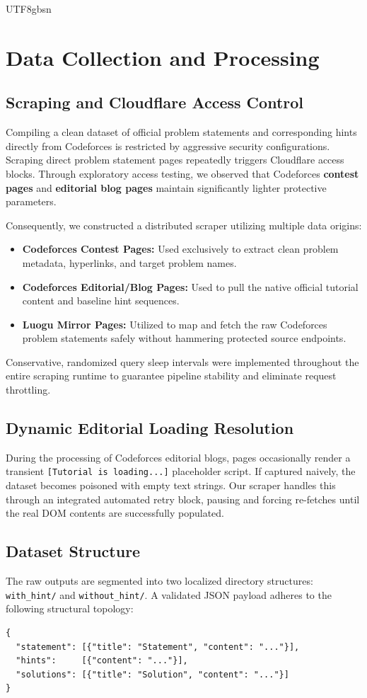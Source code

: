 \documentclass{article}
\begin{document}
\begin{CJK*}{UTF8}{gbsn}
\section{Data Collection and Processing}

\subsection{Scraping and Cloudflare Access Control}
Compiling a clean dataset of official problem statements and corresponding hints directly from Codeforces is restricted by aggressive security configurations. Scraping direct problem statement pages repeatedly triggers Cloudflare access blocks. Through exploratory access testing, we observed that Codeforces \textbf{contest pages} and \textbf{editorial blog pages} maintain significantly lighter protective parameters.

Consequently, we constructed a distributed scraper utilizing multiple data origins:
\begin{itemize}
    \item \textbf{Codeforces Contest Pages:} Used exclusively to extract clean problem metadata, hyperlinks, and target problem names.
    \item \textbf{Codeforces Editorial/Blog Pages:} Used to pull the native official tutorial content and baseline hint sequences.
    \item \textbf{Luogu Mirror Pages:} Utilized to map and fetch the raw Codeforces problem statements safely without hammering protected source endpoints.
\end{itemize}
Conservative, randomized query sleep intervals were implemented throughout the entire scraping runtime to guarantee pipeline stability and eliminate request throttling.

\subsection{Dynamic Editorial Loading Resolution}
During the processing of Codeforces editorial blogs, pages occasionally render a transient \texttt{[Tutorial is loading...]} placeholder script. If captured naively, the dataset becomes poisoned with empty text strings. Our scraper handles this through an integrated automated retry block, pausing and forcing re-fetches until the real DOM contents are successfully populated.

\subsection{Dataset Structure}
The raw outputs are segmented into two localized directory structures: \texttt{with\_hint/} and \texttt{without\_hint/}. A validated JSON payload adheres to the following structural topology:
\begin{verbatim}
{
  "statement": [{"title": "Statement", "content": "..."}],
  "hints":     [{"content": "..."}],
  "solutions": [{"title": "Solution", "content": "..."}]
}
\end{verbatim}


\end{CJK*}
\end{document}
